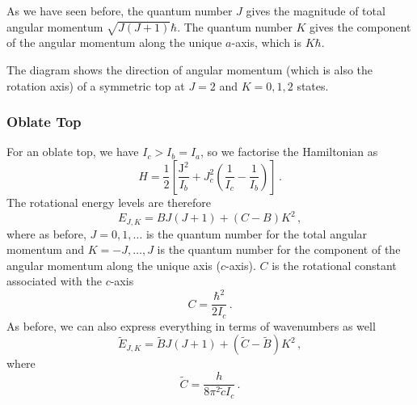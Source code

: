 \documentclass{article}
\theoremstyle{plain}\theoremheaderfont{\normalfont\itshape}\theorembodyfont{\rmfamily}\theoremseparator{.}\newtheorem*{rem}{Remark}\newtheorem*{ex}{Example}\newtheorem*{proof}{Proof}\newtheorem*{altp}{Alternative proof}
\theoremstyle{plain}\theoremheaderfont{\normalfont\bfseries}\theorembodyfont{\rmfamily}\theoremseparator{.}\newtheorem{thm}{Theorem}[section]\newtheorem{lem}[thm]{Lemma}\newtheorem{prop}[thm]{Proposition}\newtheorem*{cor}{Corollary}\newtheorem{defn}[thm]{Definition}\newtheorem{clm}[thm]{Claim}\newtheorem{clminproof}{Claim}\newtheorem{pos}{Postulate}[section]
\theoremstyle{break}\theoremheaderfont{\normalfont\itshape}\theorembodyfont{\rmfamily}\theoremseparator{.\medskip}\newtheorem*{proofskip}{Proof}\newtheorem*{exs}{Examples}\newtheorem*{rems}{Remarks}
\theoremstyle{break}\theoremheaderfont{\normalfont\bfseries}\theorembodyfont{\rmfamily}\theoremseparator{.\medskip}\newtheorem{lemskip}[thm]{Lemma}\newtheorem{defnskip}[thm]{Definition}\newtheorem{propskip}[thm]{Proposition}\newtheorem{thmskip}[thm]{Theorem}
\numberwithin{equation}{section}
\newcommand{\vb}[1]{\bm{\mathrm{#1}}}
\begin{document}
    As we have seen before, the quantum number \(J\) gives the magnitude of total angular momentum \(\sqrt{J(J+1)}\hbar\). The quantum number \(K\) gives the component of the angular momentum along the unique \(a\)-axis, which is \(K\hbar\).

    \begin{figure}[ht!]
        \centering
    \end{figure}

    The diagram shows the direction of angular momentum (which is also the rotation axis) of a symmetric top at \(J=2\) and \(K=0,1,2\) states.
    \subsubsection*{Oblate Top}
    For an oblate top, we have \(I_c>I_b=I_a\), so we factorise the Hamiltonian as
    \begin{equation}
        H=\frac{1}{2}\left[\frac{\vb{J}^2}{I_b}+J_c^2\left(\frac{1}{I_c}-\frac{1}{I_b}\right)\right]\,.
    \end{equation}
    The rotational energy levels are therefore
    \begin{equation}
        E_{J,K}=BJ(J+1)+(C-B)K^2\,,
    \end{equation}
    where as before, \(J=0,1,\dots\) is the quantum number for the total angular momentum and \(K=-J,\dots,J\) is the quantum number for the component of the angular momentum along the unique axis (\(c\)-axis). \(C\) is the rotational constant associated with the \(c\)-axis
    \begin{equation}
        C=\frac{\hbar^2}{2I_c}\,.
    \end{equation}
    As before, we can also express everything in terms of wavenumbers as well
    \begin{equation}
        \tilde{E}_{J,K}=\tilde{B}J(J+1)+(\tilde{C}-\tilde{B})K^2\,,
    \end{equation}
    where
    \begin{equation}
        \tilde{C}=\frac{h}{8\pi^2\tilde{c}I_c}\,.
    \end{equation}
\end{document}
